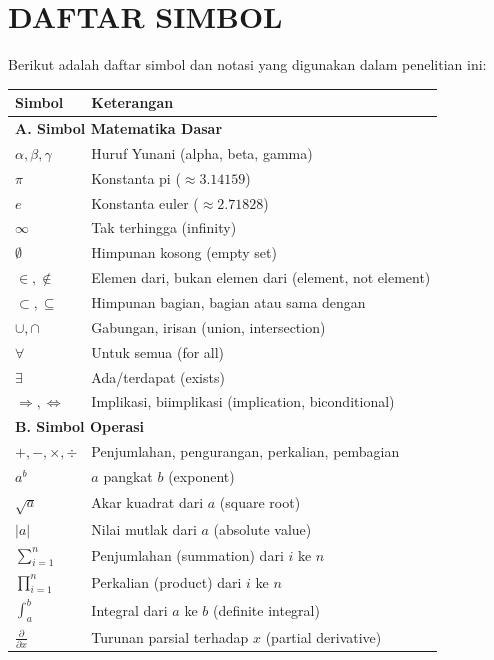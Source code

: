 \chapter*{DAFTAR SIMBOL}

Berikut adalah daftar simbol dan notasi yang digunakan dalam penelitian ini:

\vspace{0.5cm}

\noindent
\begin{tabularx}{\textwidth}{@{} l X @{}}
\toprule
\textbf{Simbol} & \textbf{Keterangan} \\
\midrule

\multicolumn{2}{l}{\textbf{A. Simbol Matematika Dasar}} \\
$\alpha, \beta, \gamma$ & Huruf Yunani (alpha, beta, gamma) \\
$\pi$ & Konstanta pi ($\approx 3.14159$) \\
$e$ & Konstanta euler ($\approx 2.71828$) \\
$\infty$ & Tak terhingga (infinity) \\
$\emptyset$ & Himpunan kosong (empty set) \\
$\in, \notin$ & Elemen dari, bukan elemen dari (element, not element) \\
$\subset, \subseteq$ & Himpunan bagian, bagian atau sama dengan \\
$\cup, \cap$ & Gabungan, irisan (union, intersection) \\
$\forall$ & Untuk semua (for all) \\
$\exists$ & Ada/terdapat (exists) \\
$\Rightarrow, \Leftrightarrow$ & Implikasi, biimplikasi (implication, biconditional) \\

\multicolumn{2}{l}{\textbf{B. Simbol Operasi}} \\
$+, -, \times, \div$ & Penjumlahan, pengurangan, perkalian, pembagian \\
$a^b$ & $a$ pangkat $b$ (exponent) \\
$\sqrt{a}$ & Akar kuadrat dari $a$ (square root) \\
$|a|$ & Nilai mutlak dari $a$ (absolute value) \\
$\sum_{i=1}^{n}$ & Penjumlahan (summation) dari $i$ ke $n$ \\
$\prod_{i=1}^{n}$ & Perkalian (product) dari $i$ ke $n$ \\
$\int_a^b$ & Integral dari $a$ ke $b$ (definite integral) \\
$\frac{\partial}{\partial x}$ & Turunan parsial terhadap $x$ (partial derivative) \\


\end{tabularx}
